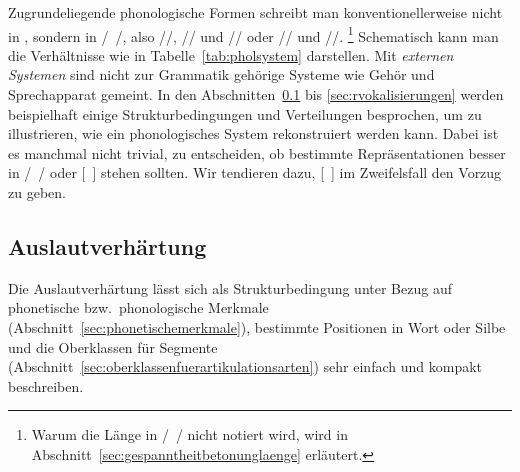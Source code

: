 \begin{table}[!htbp]
  \caption{Lexikon, Phonologie und Phonetik}
  \label{tab:pholsystem}
\end{table}

Zugrundeliegende phonologische Formen schreibt man konventionellerweise nicht in \textipa{[~]}, sondern in /~/, also \zB //, // und // oder // und \mbox{//}.%
\footnote{Warum die Länge in /~/ nicht notiert wird, wird in Abschnitt~\ref{sec:gespanntheitbetonunglaenge} erläutert.}
Schematisch kann man die Verhältnisse wie in Tabelle~\ref{tab:pholsystem} darstellen.
Mit \textit{externen Systemen} sind nicht zur Grammatik gehörige Systeme wie Gehör und Sprechapparat gemeint.
In den Abschnitten~\ref{sec:auslautverhaertungphonologie} bis \ref{sec:rvokalisierungen} werden beispielhaft einige Strukturbedingungen und Verteilungen besprochen, um zu illustrieren, wie ein phonologisches System rekonstruiert werden kann.
Dabei ist es manchmal nicht trivial, zu entscheiden, ob bestimmte Repräsentationen besser in /~/ oder [~] stehen sollten.
Wir tendieren dazu, [~] im Zweifelsfall den Vorzug zu geben.

\subsection{Auslautverhärtung}

\label{sec:auslautverhaertungphonologie}

Die Auslautverhärtung lässt sich als Strukturbedingung unter Bezug auf phonetische bzw.\ phonologische Merkmale (Abschnitt~\ref{sec:phonetischemerkmale}), bestimmte Positionen in Wort oder Silbe und die Oberklassen für Segmente (Abschnitt~\ref{sec:oberklassenfuerartikulationsarten}) sehr einfach und kompakt beschreiben.



